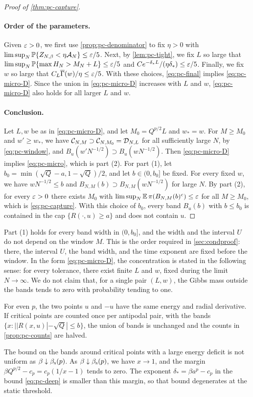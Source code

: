 \begin{proof}[Proof of \cref{thm:pc-capture}]
\paragraph{Order of the parameters.}
Given $\varepsilon>0$, we first use \cref{prop:pc-denominator} to fix $\eta>0$ with $\limsup_N\mathbb P\{Z_{N,\beta}<\eta\mathcal A_N\}\le\varepsilon/5$. Next, by \cref{lem:pc-tight}, we fix $L$ so large that $\limsup_N\mathbb P\{\max H_N>M_N+L\}\le\varepsilon/5$ and $Ce^{-\delta_*L}/(\eta\delta_*)\le\varepsilon/5$. Finally, we fix $w$ so large that $C_L\overline\Gamma(w)/\eta\le\varepsilon/5$. With these choices, \eqref{eq:pc-final} implies \eqref{eq:pc-micro-D}. Since the union in \eqref{eq:pc-micro-D} increases with $L$ and $w$, \eqref{eq:pc-micro-D} also holds for all larger $L$ and $w$.

\paragraph{Conclusion.}
Let $L,w$ be as in \eqref{eq:pc-micro-D}, and let $M_0=Q^{p/2}L$ and $w_*=w$. For $M\ge M_0$ and $w'\ge w_*$, we have $\mathcal C_{N,M}\supset\mathcal C_{N,M_0}=\mathcal D_{N,L}$ for all sufficiently large $N$, by \eqref{eq:pc-window}, and $B_u(w'N^{-1/2})\supset B_u(wN^{-1/2})$. Then \eqref{eq:pc-micro-D} implies \eqref{eq:pc-micro}, which is part (2). For part (1), let $b_0=\min(\sqrt Q-a,1-\sqrt Q)/2$, and let $b\in(0,b_0]$ be fixed. For every fixed $w$, we have $wN^{-1/2}\le b$ and $B_{N,M}(b)\supset B_{N,M}(wN^{-1/2})$ for large $N$. By part (2), for every $\varepsilon>0$ there exists $M_0$ with $\limsup_N\mathbb E\,\pi(B_{N,M}(b)^c)\le\varepsilon$ for all $M\ge M_0$, which is \eqref{eq:pc-capture}. With this choice of $b_0$, every band $B_u(b)$ with $b\le b_0$ is contained in the cap $\{R(\cdot,u)\ge a\}$ and does not contain $u$.
\end{proof}

Part (1) holds for every band width in $(0,b_0]$, and the width and the interval $U$ do not depend on the window $M$. This is the order required in \cref{sec:condproof}: there, the interval $U$, the band width, and the time exponent are fixed before the window. In the form \eqref{eq:pc-micro-D}, the concentration is stated in the following sense: for every tolerance, there exist finite $L$ and $w$, fixed during the limit $N\to\infty$. We do not claim that, for a single pair $(L,w)$, the Gibbs mass outside the bands tends to zero with probability tending to one.

For even $p$, the two points $u$ and $-u$ have the same energy and radial derivative. If critical points are counted once per antipodal pair, with the bands $\{x:||R(x,u)|-\sqrt Q|\le b\}$, the union of bands is unchanged and the counts in \cref{prop:pc-counts} are halved.

\begin{remark}\label{rem:pc-boundary}
The bound on the bands around critical points with a large energy deficit is not uniform as $\beta\downarrow\beta_{\mathrm s}(p)$. As $\beta\downarrow\beta_{\mathrm s}(p)$, we have $x\to1$, and the margin $\beta Q^{p/2}-c_p=c_p(1/x-1)$ tends to zero. The exponent $\delta_*=\beta a^p-c_p$ in the bound \eqref{eq:pc-deep} is smaller than this margin, so that bound degenerates at the static threshold.
\end{remark}
